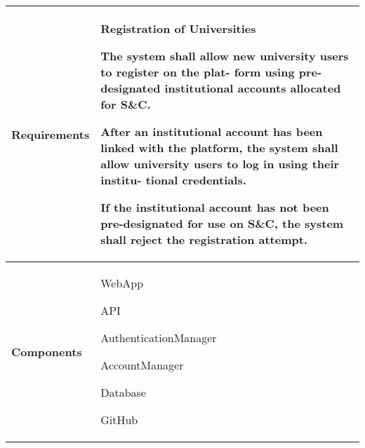\begin{table}[h]
    \centering
    \renewcommand{\arraystretch}{1.5} %
    \begin{tabular}{|C{0.3\textwidth}|L{0.65\textwidth}|} %
        \hline
        \textbf{Requirements} & 
        \textbf{Registration of Universities} \par
        [FR10] The system shall allow new university users to register on the plat-
        form using pre-designated institutional accounts allocated for S\&C. \par
        [FR11] After an institutional account has been linked with the platform,
        the system shall allow university users to log in using their institu-
        tional credentials. \par
        [FR12] If the institutional account has not been pre-designated for use on
        S\&C, the system shall reject the registration attempt. \\
        \hline
        \textbf{Components} & 
        WebApp \par
        API \par
        AuthenticationManager \par
        AccountManager \par
        Database \par
        GitHub \\
        \hline
    \end{tabular}
\end{table}


